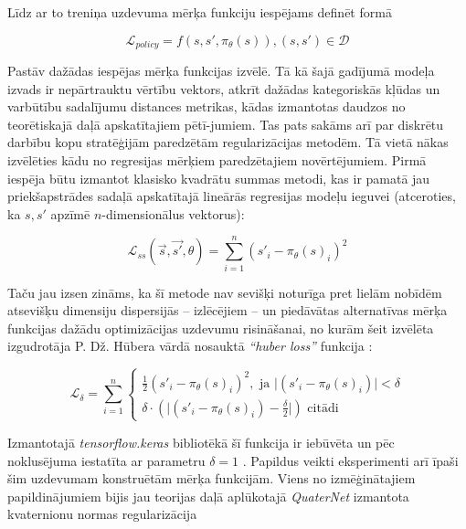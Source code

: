 \documentclass[12pt, a4paper]{article}
\numberwithin{equation}{section} %
\begin{document}
Līdz ar to treniņa uzdevuma mērķa funkciju iespējams definēt formā

\begin{equation}
    \mathcal{L}_{policy} = f \left (s,s',\pi_{\theta}(s) \right ), (s,s') \in \mathcal{D}
\end{equation}

Pastāv dažādas iespējas mērķa funkcijas izvēlē. Tā kā šajā gadījumā modeļa izvads ir nepārtrauktu vērtību vektors, atkrīt dažādas kategoriskās kļūdas un varbūtību sadalījumu distances metrikas, kādas izmantotas daudzos no teorētiskajā daļā apskatītajiem pētī-jumiem. Tas pats sakāms arī par diskrētu darbību kopu stratēģijām paredzētām regularizācijas metodēm. Tā vietā nākas izvēlēties kādu no regresijas mērķiem paredzētajiem novērtējumiem. Pirmā iespēja būtu izmantot klasisko kvadrātu summas metodi, kas ir pamatā jau priekšapstrādes sadaļā apskatītajā lineārās regresijas modeļu ieguvei (atceroties, ka $s, s'$ apzīmē $n$-dimensionālus vektorus):


\begin{equation}
    \mathcal{L}_{ss} (\vec{s},\vec{s'},\theta) = \sum_{i=1}^n (s'_i - \pi_{\theta}(s)_i)^2 
\end{equation}

Taču jau izsen zināms, ka šī metode nav sevišķi noturīga pret lielām nobīdēm atsevišķu dimensiju dispersijās -- izlēcējiem -- un piedāvātas alternatīvas mērķa funkcijas dažādu optimizācijas uzdevumu risināšanai, no kurām šeit izvēlēta izgudrotāja P. Dž. Hūbera vārdā nosauktā \textit{``huber loss''} funkcija \cite{huber_loss}:


\begin{equation}
    \mathcal{L}_{\delta} =  \sum_{i=1}^n 
    \begin{cases}
    \frac{1}{2} (s'_i - \pi_{\theta}(s)_i)^2, \text{ ja } \vert (s'_i - \pi_{\theta}(s)_i) \vert < \delta \\
    \delta \cdot \left (  \vert (s'_i - \pi_{\theta}(s)_i) - \frac{\delta}{2} \vert  \right ) \text{ citādi}
    \end{cases}
\end{equation}


Izmantotajā \textit{tensorflow.keras} bibliotēkā šī funkcija ir iebūvēta un pēc noklusējuma iestatīta ar parametru $\delta = 1$ \cite{keras_huber}. Papildus veikti eksperimenti arī īpaši šim uzdevumam konstruētām mērķa funkcijām. Viens no izmēģinātajiem papildinājumiem bijis jau teorijas daļā aplūkotajā \textit{QuaterNet} izmantota kvaternionu normas regularizācija \cite{pavllo2018quaternet}
\end{document}
